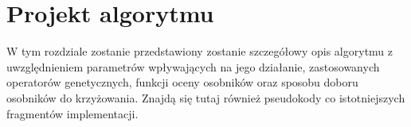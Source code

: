 \chapter{Projekt algorytmu}
\thispagestyle{chapterBeginStyle}

W tym rozdziale zostanie przedstawiony zostanie szczegółowy opis algorytmu z uwzględnieniem parametrów wpływających na jego działanie, zastosowanych operatorów genetycznych, funkcji oceny osobników oraz sposobu doboru osobników do krzyżowania. Znajdą się tutaj również pseudokody co istotniejszych fragmentów implementacji. 